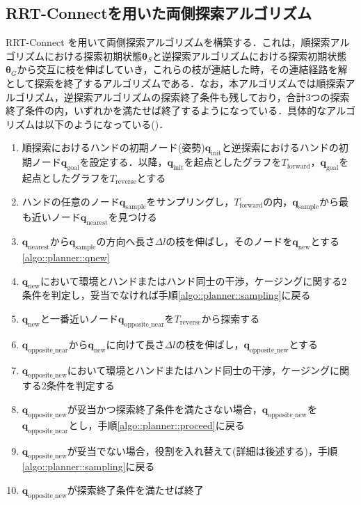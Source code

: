 \documentclass[a4paper,twoside,12pt,papersize, dvipdfmx]{iirthesis}
\begin{document}
\subsection{RRT-Connectを用いた両側探索アルゴリズム}
RRT-Connect \cite{kuffner2000}を用いて両側探索アルゴリズムを構築する．これは，順探索アルゴリズムにおける探索初期状態$\bm {\theta}_S$と逆探索アルゴリズムにおける探索初期状態$\bm {\theta}_G$から交互に枝を伸ばしていき，これらの枝が連結した時，その連結経路を解として探索を終了するアルゴリズムである．なお，本アルゴリズムでは順探索アルゴリズム，逆探索アルゴリズムの探索終了条件も残しており，合計3つの探索終了条件の内，いずれかを満たせば終了するようになっている．具体的なアルゴリズムは以下のようになっている(\figref{})．
\begin{enumerate}
\item 順探索におけるハンドの初期ノード(姿勢)$\bm{q}_{\mathrm {init}}$と逆探索におけるハンドの初期ノード$\bm{q}_{\mathrm {goal}}$を設定する．以降，$\bm{q}_{\mathrm {init}}$を起点としたグラフを$T_{\mathrm {forward}}$，$\bm{q}_{\mathrm {goal}}$を起点としたグラフを$T_{\mathrm {reverse}}$とする
\item ハンドの任意のノード$\bm{q}_{\mathrm {sample}}$をサンプリングし，$T_{\mathrm {forward}}$の内，$\bm{q}_{\mathrm{sample}}$から最も近いノード$\bm{q}_{\mathrm{nearest}}$を見つける\label{algo::planner::sampling}
\item $\bm{q}_{\mathrm{nearest}}$から$\bm{q}_{\mathrm{sample}}$の方向へ長さ$\Delta l$の枝を伸ばし，そのノードを$\bm{q}_{\mathrm{new}}$とする \ref{algo::planner::qnew}
\item $\bm{q}_{\mathrm{new}}$において環境とハンドまたはハンド同士の干渉，ケージングに関する2条件を判定し，妥当でなければ手順\ref{algo::planner::sampling}に戻る
\item $\bm{q}_{\mathrm{new}}$と一番近いノード$\bm{q}_{\mathrm{opposite\_near}}$を$T_{\mathrm {reverse}}$から探索する\label{algo::planner::biasbegin}
\item $\bm{q}_{\mathrm{opposite\_near}}$から$\bm{q}_{\mathrm{new}}$に向けて長さ$\Delta l$の枝を伸ばし，$\bm{q}_{\mathrm{opposite\_new}}$とする\label{algo::planner::proceed}
\item $\bm{q}_{\mathrm{opposite\_new}}$において環境とハンドまたはハンド同士の干渉，ケージングに関する2条件を判定する
\item $\bm{q}_{\mathrm{opposite\_new}}$が妥当かつ探索終了条件を満たさない場合，$\bm{q}_{\mathrm{opposite\_new}}$を$\bm{q}_{\mathrm{opposite\_near}}$とし，手順\ref{algo::planner::proceed}に戻る\label{algo::planner::biasend}
\item $\bm{q}_{\mathrm{opposite\_new}}$が妥当でない場合，役割を入れ替えて(詳細は後述する)，手順\ref{algo::planner::sampling}に戻る \label{algo::planner::change}
\item $\bm{q}_{\mathrm{opposite\_new}}$が探索終了条件を満たせば終了\label{algo::planner::goalcond}
\end{enumerate}
\end{document}
